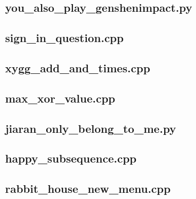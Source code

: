 \documentclass[lang=cn]{elegantpaper}
\begin{document}
    \subsection{you\_also\_play\_genshenimpact.py}
    

    \subsection{sign\_in\_question.cpp}
    

    \subsection{xygg\_add\_and\_times.cpp}
    

    \subsection{max\_xor\_value.cpp}
    

    \subsection{jiaran\_only\_belong\_to\_me.py}
    

    \subsection{happy\_subsequence.cpp}
    
    
    \subsection{rabbit\_house\_new\_menu.cpp}
    
\fi
\end{document}
